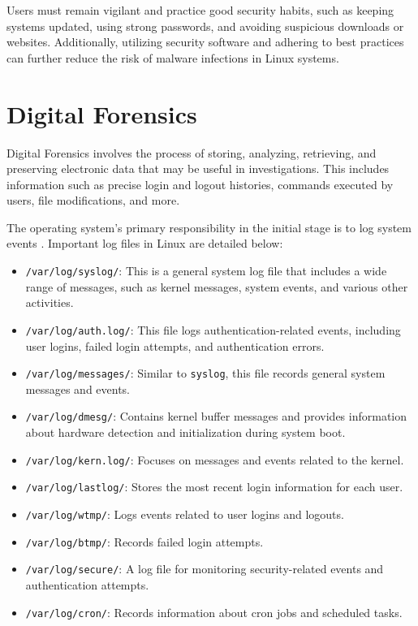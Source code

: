 \documentclass[conference]{IEEEtran}
\begin{document}
Users must remain vigilant and practice good security habits, such as keeping systems updated, using strong passwords, and avoiding suspicious downloads or websites. Additionally, utilizing security software and adhering to best practices can further reduce the risk of malware infections in Linux systems.

\section{Digital Forensics}

Digital Forensics involves the process of storing, analyzing, retrieving, and preserving electronic data that may be useful in investigations. This includes information such as precise login and logout histories, commands executed by users, file modifications, and more.

The operating system’s primary responsibility in the initial stage is to log system events \cite{tldp-security}. Important log files in Linux are detailed below:

\begin{itemize}
    \item \texttt{/var/log/syslog/}: This is a general system log file that includes a wide range of messages, such as kernel messages, system events, and various other activities.
    \item \texttt{/var/log/auth.log/}: This file logs authentication-related events, including user logins, failed login attempts, and authentication errors.
    \item \texttt{/var/log/messages/}: Similar to \texttt{syslog}, this file records general system messages and events.
    \item \texttt{/var/log/dmesg/}: Contains kernel buffer messages and provides information about hardware detection and initialization during system boot.
    \item \texttt{/var/log/kern.log/}: Focuses on messages and events related to the kernel.
    \item \texttt{/var/log/lastlog/}: Stores the most recent login information for each user.
    \item \texttt{/var/log/wtmp/}: Logs events related to user logins and logouts.
    \item \texttt{/var/log/btmp/}: Records failed login attempts.
    \item \texttt{/var/log/secure/}: A log file for monitoring security-related events and authentication attempts.
    \item \texttt{/var/log/cron/}: Records information about cron jobs and scheduled tasks.
\end{itemize}
\end{document}
